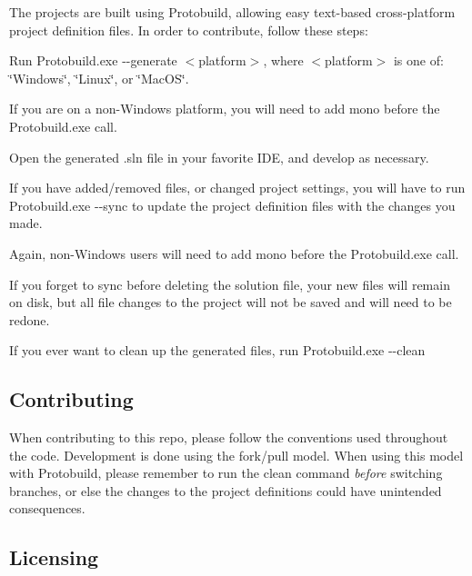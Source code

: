 The projects are built using Protobuild, allowing easy text-\/based cross-\/platform project definition files. In order to contribute, follow these steps\+:
\begin{DoxyEnumerate}
\item Run {\ttfamily Protobuild.\+exe -\/-\/generate $<$platform$>$}, where {\ttfamily $<$platform$>$} is one of\+: \char`\"{}\+Windows\char`\"{}, \char`\"{}\+Linux\char`\"{}, or \char`\"{}\+Mac\+O\+S\char`\"{}.
\begin{DoxyItemize}
\item If you are on a non-\/\+Windows platform, you will need to add {\ttfamily mono} before the Protobuild.\+exe call.
\end{DoxyItemize}
\item Open the generated \textquotesingle{}.sln\textquotesingle{} file in your favorite I\+DE, and develop as necessary.
\item If you have added/removed files, or changed project settings, you will have to run {\ttfamily Protobuild.\+exe -\/-\/sync} to update the project definition files with the changes you made.
\begin{DoxyItemize}
\item Again, non-\/\+Windows users will need to add {\ttfamily mono} before the Protobuild.\+exe call.
\item If you forget to sync before deleting the solution file, your new files will remain on disk, but all file changes to the project will not be saved and will need to be redone.
\end{DoxyItemize}
\item If you ever want to clean up the generated files, run {\ttfamily Protobuild.\+exe -\/-\/clean}
\end{DoxyEnumerate}

\subsection*{Contributing}

When contributing to this repo, please follow the conventions used throughout the code. Development is done using the fork/pull model. When using this model with Protobuild, please remember to run the {\ttfamily clean} command {\itshape before} switching branches, or else the changes to the project definitions could have unintended consequences.

\subsection*{Licensing}

